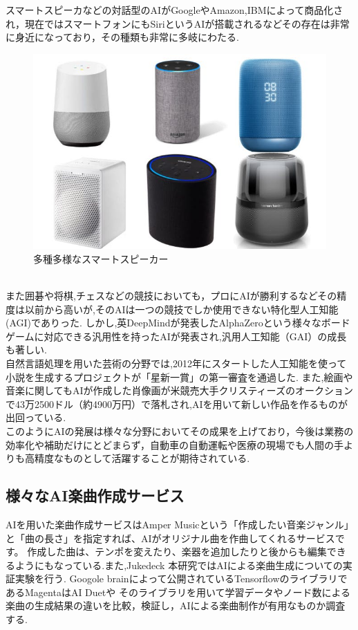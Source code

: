 スマートスピーカなどの対話型のAIがGoogleやAmazon,IBMによって商品化され，現在ではスマートフォンにもSiriというAIが搭載されるなどその存在は非常に身近になっており，その種類も非常に多岐にわたる.
\begin{figure}[!ht]
    \begin{screen}
    \begin{center}
        \includegraphics[scale=0.6, clip]{./img/smartspeaker_list.jpg}
        \caption{多種多様なスマートスピーカー}
        \label{fig:多種多様なスマートスピーカー}
    \end{center}
\end{screen}
\end{figure}\\
また囲碁や将棋,チェスなどの競技においても，プロにAIが勝利するなどその精度は以前から高いが,そのAIは一つの競技でしか使用できない特化型人工知能(AGI)でありった.
しかし,英DeepMindが発表したAlphaZeroという様々なボードゲームに対応できる汎用性を持ったAIが発表され,汎用人工知能（GAI）の成長も著しい.\\
自然言語処理を用いた芸術の分野では,2012年にスタートした人工知能を使って小説を生成するプロジェクトが「星新一賞」の第一審査を通過した.
また,絵画や音楽に関してもAIが作成した肖像画が米競売大手クリスティーズのオークションで43万2500ドル（約4900万円）で落札され,AIを用いて新しい作品を作るものが出回っている.\\
このようにAIの発展は様々な分野においてその成果を上げており，今後は業務の効率化や補助だけにとどまらず，自動車の自動運転や医療の現場でも人間の手よりも高精度なものとして活躍することが期待されている.
\subsection{様々なAI楽曲作成サービス}
AIを用いた楽曲作成サービスはAmper Musicという「作成したい音楽ジャンル」と「曲の長さ」を指定すれば、AIがオリジナル曲を作曲してくれるサービスです。 作成した曲は、テンポを変えたり、楽器を追加したりと後からも編集できるようにもなっている.また,Jukedeck
本研究ではAIによる楽曲生成についての実証実験を行う.
Googole brainによって公開されているTensorflowのライブラリであるMagentaはAI Duetや
そのライブラリを用いて学習データやノード数による楽曲の生成結果の違いを比較，検証し，AIによる楽曲制作が有用なものか調査する.\\
